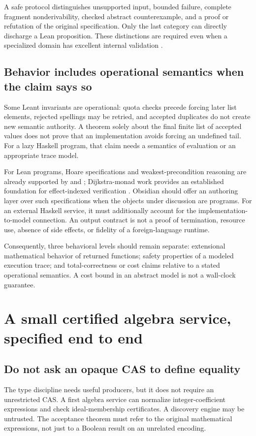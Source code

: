 \documentclass[11pt,a4paper]{article}
\newcommand{\code}[1]{\texttt{\detokenize{#1}}}
\theoremstyle{plain}\newtheorem{proposition}{Proposition}[section]
\theoremstyle{definition}\newtheorem{definition}[proposition]{Definition}
\theoremstyle{remark}\newtheorem{remark}[proposition]{Remark}
\begin{document}
A safe protocol distinguishes unsupported input, bounded failure, complete fragment nonderivability, checked abstract counterexample, and a proof or refutation of the original specification. Only the last category can directly discharge a Lean proposition. These distinctions are required even when a specialized domain has excellent internal validation \cite{synA,synB,leantengine}.

\subsection{Behavior includes operational semantics when the claim says so}
Some Leant invariants are operational: quota checks precede forcing later list elements, rejected spellings may be retried, and accepted duplicates do not create new semantic authority. A theorem solely about the final finite list of accepted values does not prove that an implementation avoids forcing an undefined tail. For a lazy Haskell program, that claim needs a semantics of evaluation or an appropriate trace model.

For Lean programs, Hoare specifications and weakest-precondition reasoning are already supported by \code{Std.Do} and \code{mvcgen}; Dijkstra-monad work provides an established foundation for effect-indexed verification \cite{mvcgen,dijkstra}. Obsidian should offer an authoring layer over such specifications when the objects under discussion are programs. For an external Haskell service, it must additionally account for the implementation-to-model connection. An output contract is not a proof of termination, resource use, absence of side effects, or fidelity of a foreign-language runtime.

Consequently, three behavioral levels should remain separate: extensional mathematical behavior of returned functions; safety properties of a modeled execution trace; and total-correctness or cost claims relative to a stated operational semantics. A cost bound in an abstract model is not a wall-clock guarantee.

\section{A small certified algebra service, specified end to end}\label{sec:cas}
\subsection{Do not ask an opaque CAS to define equality}
The type discipline needs useful producers, but it does not require an unrestricted CAS. A first algebra service can normalize integer-coefficient expressions and check ideal-membership certificates. A discovery engine may be untrusted. The acceptance theorem must refer to the original mathematical expressions, not just to a Boolean result on an unrelated encoding.
\end{document}
